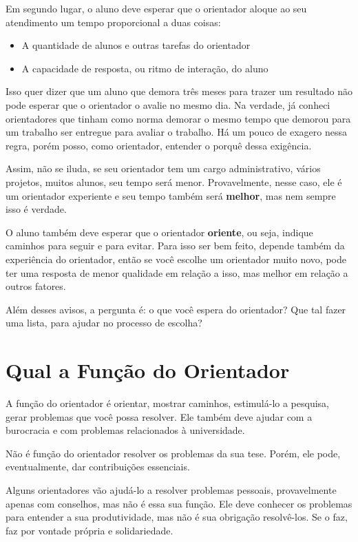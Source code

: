 Em segundo lugar, o aluno deve esperar que o orientador aloque ao seu atendimento um tempo proporcional a duas coisas:
\begin{itemize}
    \item A quantidade de alunos e outras tarefas do orientador
    \item A capacidade de resposta, ou ritmo de interação, do aluno
\end{itemize}
Isso quer dizer que um aluno que demora três meses para trazer um resultado não pode esperar que o orientador o avalie no mesmo dia. Na verdade, já conheci orientadores que tinham como norma demorar o mesmo tempo que demorou para um trabalho ser entregue para avaliar o trabalho. Há um pouco de exagero nessa regra, porém posso, como orientador, entender o porquê dessa exigência.

Assim, não se iluda, se seu orientador tem um cargo administrativo, vários projetos, muitos alunos, seu tempo será menor. Provavelmente, nesse caso, ele é um orientador experiente e seu tempo também será \textbf{melhor}, mas nem sempre isso é verdade.

O aluno também deve esperar que o orientador \textbf{oriente}, ou seja, indique caminhos para seguir e para evitar. Para isso ser bem feito, depende também da experiência do orientador, então se você escolhe um orientador muito novo, pode ter uma resposta de menor qualidade em relação a isso, mas melhor em relação a outros fatores.

Além desses avisos, a pergunta é: o que você espera do orientador? Que tal fazer uma lista, para ajudar no processo de escolha?


\section{Qual a Função do Orientador}

A função do orientador é orientar, mostrar caminhos, estimulá-lo a pesquisa, gerar problemas que você possa resolver. Ele também deve ajudar com a burocracia e com problemas relacionados à universidade. 

Não é função do orientador resolver os problemas da sua tese. Porém, ele pode, eventualmente, dar contribuições essenciais.

Alguns orientadores vão ajudá-lo a resolver problemas pessoais, provavelmente apenas com conselhos, mas não é essa sua função. Ele deve conhecer os problemas para entender a sua produtividade, mas não é sua obrigação resolvê-los. Se o faz, faz por vontade própria e solidariedade.

